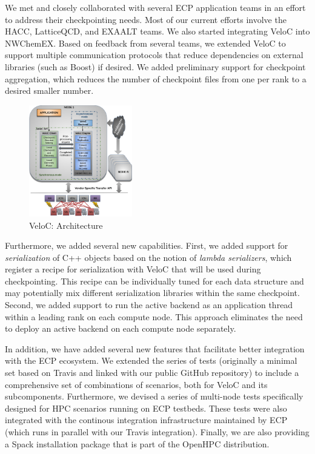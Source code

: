 We met and closely collaborated with several ECP application teams in
an effort to address their checkpointing needs. Most of our current
efforts involve the HACC, LatticeQCD, and EXAALT teams. We also
started integrating VeloC into NWChemEX. Based on feedback from
several teams, we extended VeloC to support multiple communication
protocols that reduce dependencies on external libraries (such as
Boost) if desired.  We added preliminary support for
checkpoint aggregation, which reduces the number of checkpoint files
from one per rank to a desired smaller number.

\begin{figure}
  \includegraphics[width=0.4\textwidth]{projects/2.3.4-DataViz/2.3.4.14-VeloC-SZ/veloc-arch}
  \caption{VeloC: Architecture}%
  \label{fig:veloc:arch}%
\end{figure}

Furthermore, we added several new capabilities. First, we added
support for \emph{serialization} of C++ objects based on the notion
of \emph{lambda serializers}, which register a recipe for
serialization with VeloC that will be used during checkpointing. This
recipe can be individually tuned for each data structure 
and may potentially mix different serialization libraries within the
same checkpoint. Second, we added support to run the active backend as
an application thread within a leading rank on each compute node. This
approach eliminates the need to deploy an active backend on each
compute node separately.

In addition, we have added several new features that facilitate better
integration with the ECP ecosystem. We extended the series of tests
(originally a minimal set based on Travis and linked with our public
GitHub repository) to include a comprehensive set of combinations of
scenarios, both for VeloC and its subcomponents. Furthermore, we
devised a series of multi-node tests specifically designed for
HPC scenarios running on ECP testbeds. These tests were also integrated
with the continous integration infrastructure maintained by ECP
(which runs in parallel with our Travis integration). Finally, we
are also providing a Spack installation package that is part of the
OpenHPC distribution.

